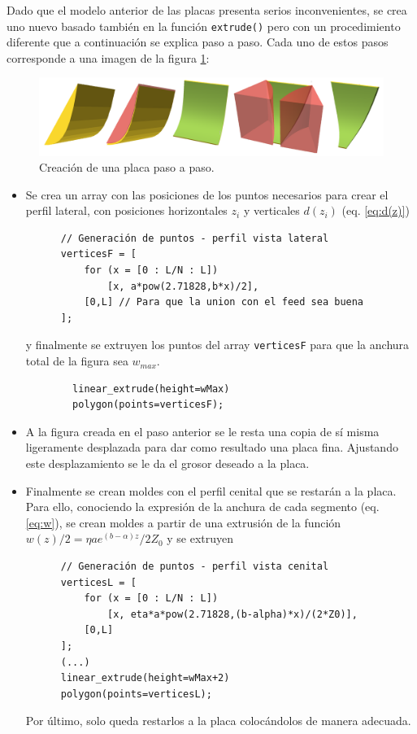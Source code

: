 \documentclass[11pt,a4paper,twoside,pdf]{article}
\numberwithin{equation}{section}
\begin{document}
Dado que el modelo anterior de las placas presenta serios inconvenientes, se crea uno nuevo basado también en la función \texttt{extrude()} pero con un procedimiento diferente que a continuación se explica paso a paso. Cada uno de estos pasos corresponde a una imagen de la figura \ref{fig:placasCurvas}:
\begin{figure}[!h]
    \centering
    \includegraphics[width=\linewidth]{img/modelos/2025_02_21-ExtrudeFunctYSuavizado/placasCurvas.png}
    \caption{Creación de una placa paso a paso.}
    \label{fig:placasCurvas}
\end{figure}
\begin{itemize}
    \item[1.] Se crea un array con las posiciones de los puntos necesarios para crear el perfil lateral, con posiciones horizontales $z_i$ y verticales $d(z_i)$ (eq. \ref{eq:d(z)})
    \begin{verbatim}
      // Generación de puntos - perfil vista lateral
      verticesF = [
          for (x = [0 : L/N : L])
              [x, a*pow(2.71828,b*x)/2],
          [0,L] // Para que la union con el feed sea buena
      ];
    \end{verbatim}
    y finalmente se extruyen los puntos del array \texttt{verticesF} para que la anchura total de la figura sea $w_{max}$.
    \begin{verbatim}
        linear_extrude(height=wMax)
        polygon(points=verticesF);
    \end{verbatim}

    \item[2 y 3.] A la figura creada en el paso anterior se le resta una copia de sí misma ligeramente desplazada para dar como resultado una placa fina. Ajustando este desplazamiento se le da el grosor deseado a la placa.

    \item[4 y 5.] Finalmente se crean moldes con el perfil cenital que se restarán a la placa. Para ello, conociendo la expresión de la anchura de cada segmento (eq. \ref{eq:w}), se crean moldes a partir de una extrusión de la función $w(z)/2=\eta a e^{(b-\alpha)z}/2Z_0$ y se extruyen
    \begin{verbatim}
      // Generación de puntos - perfil vista cenital
      verticesL = [
          for (x = [0 : L/N : L])
              [x, eta*a*pow(2.71828,(b-alpha)*x)/(2*Z0)],
          [0,L]
      ];
      (...)
      linear_extrude(height=wMax+2)
      polygon(points=verticesL);      
    \end{verbatim}
    Por último, solo queda restarlos a la placa colocándolos de manera adecuada.\\
\end{itemize}
\end{document}
